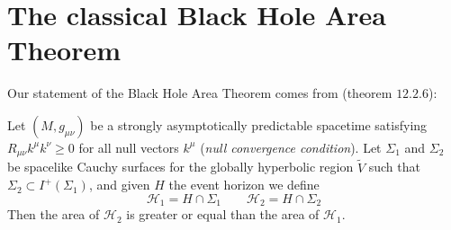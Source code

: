 
\section{The classical Black Hole Area Theorem}
\label{sec:classical-bh-area}

Our statement of the Black Hole Area Theorem comes from \cite{wald2010general} (theorem \(12.2.6\)):
\begin{theorem}
	\label{th:classical-bh-area}
	Let \((M, g_{\mu\nu})\) be a strongly asymptotically predictable spacetime satisfying \(R_{\mu\nu}k^{\mu}k^{\nu} \ge 0\) for all null vectors \(k^{\mu}\) (\emph{null convergence condition}). Let \(\Sigma_1\) and \(\Sigma_2\) be spacelike Cauchy surfaces for the globally hyperbolic region \(\tilde{V}\) such that \(\Sigma_2 \subset I^+(\Sigma_1)\), and given \(H\) the event horizon we define
	\[
	\mathscr{H}_1 = H \cap \Sigma_1 \quad \quad \mathscr{H}_2 = H \cap \Sigma_2
	\]
	Then the area of \(\mathscr{H}_2\) is greater or equal than the area of \(\mathscr{H}_1\).
\end{theorem}

